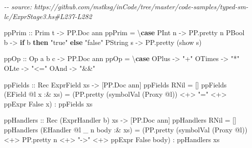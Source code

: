 \documentclass[]{article}
\newenvironment{Shaded}{}{}
\newcommand{\CommentTok}[1]{\textcolor[rgb]{0.38,0.63,0.69}{\textit{#1}}}
\newcommand{\DataTypeTok}[1]{\textcolor[rgb]{0.56,0.13,0.00}{#1}}
\newcommand{\FunctionTok}[1]{\textcolor[rgb]{0.02,0.16,0.49}{#1}}
\newcommand{\KeywordTok}[1]{\textcolor[rgb]{0.00,0.44,0.13}{\textbf{#1}}}
\newcommand{\NormalTok}[1]{#1}
\newcommand{\OperatorTok}[1]{\textcolor[rgb]{0.40,0.40,0.40}{#1}}
\newcommand{\OtherTok}[1]{\textcolor[rgb]{0.00,0.44,0.13}{#1}}
\newcommand{\StringTok}[1]{\textcolor[rgb]{0.25,0.44,0.63}{#1}}
\begin{document}
\begin{Shaded}
\begin{Highlighting}[]
\CommentTok{{-}{-} source: https://github.com/mstksg/inCode/tree/master/code{-}samples/typed{-}sm{-}lc/ExprStage3.hs\#L237{-}L282}

\OtherTok{ppPrim ::} \DataTypeTok{Prim}\NormalTok{ t }\OtherTok{{-}\textgreater{}} \DataTypeTok{PP.Doc}\NormalTok{ ann}
\NormalTok{ppPrim }\OtherTok{=}\NormalTok{ \textbackslash{}}\KeywordTok{case}
  \DataTypeTok{PInt}\NormalTok{ n }\OtherTok{{-}\textgreater{}}\NormalTok{ PP.pretty n}
  \DataTypeTok{PBool}\NormalTok{ b }\OtherTok{{-}\textgreater{}} \KeywordTok{if}\NormalTok{ b }\KeywordTok{then} \StringTok{"true"} \KeywordTok{else} \StringTok{"false"}
  \DataTypeTok{PString}\NormalTok{ s }\OtherTok{{-}\textgreater{}}\NormalTok{ PP.pretty (}\FunctionTok{show}\NormalTok{ s)}

\OtherTok{ppOp ::} \DataTypeTok{Op}\NormalTok{ a b c }\OtherTok{{-}\textgreater{}} \DataTypeTok{PP.Doc}\NormalTok{ ann}
\NormalTok{ppOp }\OtherTok{=}\NormalTok{ \textbackslash{}}\KeywordTok{case}
  \DataTypeTok{OPlus} \OtherTok{{-}\textgreater{}} \StringTok{"+"}
  \DataTypeTok{OTimes} \OtherTok{{-}\textgreater{}} \StringTok{"*"}
  \DataTypeTok{OLte} \OtherTok{{-}\textgreater{}} \StringTok{"\textless{}="}
  \DataTypeTok{OAnd} \OtherTok{{-}\textgreater{}} \StringTok{"\&\&"}

\OtherTok{ppFields ::} \DataTypeTok{Rec} \DataTypeTok{ExprField}\NormalTok{ xs }\OtherTok{{-}\textgreater{}}\NormalTok{ [}\DataTypeTok{PP.Doc}\NormalTok{ ann]}
\NormalTok{ppFields }\DataTypeTok{RNil} \OtherTok{=}\NormalTok{ []}
\NormalTok{ppFields (}\DataTypeTok{EField} \OperatorTok{@}\NormalTok{l x }\OperatorTok{:\&}\NormalTok{ xs) }\OtherTok{=}
\NormalTok{  (PP.pretty (symbolVal (}\DataTypeTok{Proxy} \OperatorTok{@}\NormalTok{l)) }\OperatorTok{\textless{}+\textgreater{}} \StringTok{"="} \OperatorTok{\textless{}+\textgreater{}}\NormalTok{ ppExpr }\DataTypeTok{False}\NormalTok{ x) }\OperatorTok{:}\NormalTok{ ppFields xs}

\OtherTok{ppHandlers ::} \DataTypeTok{Rec}\NormalTok{ (}\DataTypeTok{ExprHandler}\NormalTok{ b) xs }\OtherTok{{-}\textgreater{}}\NormalTok{ [}\DataTypeTok{PP.Doc}\NormalTok{ ann]}
\NormalTok{ppHandlers }\DataTypeTok{RNil} \OtherTok{=}\NormalTok{ []}
\NormalTok{ppHandlers (}\DataTypeTok{EHandler} \OperatorTok{@}\NormalTok{l \_ n body }\OperatorTok{:\&}\NormalTok{ xs) }\OtherTok{=}
\NormalTok{  (PP.pretty (symbolVal (}\DataTypeTok{Proxy} \OperatorTok{@}\NormalTok{l)) }\OperatorTok{\textless{}+\textgreater{}}\NormalTok{ PP.pretty n }\OperatorTok{\textless{}+\textgreater{}} \StringTok{"{-}\textgreater{}"} \OperatorTok{\textless{}+\textgreater{}}\NormalTok{ ppExpr }\DataTypeTok{False}\NormalTok{ body) }\OperatorTok{:}\NormalTok{ ppHandlers xs}


\end{Highlighting}
\end{Shaded}
\end{document}
